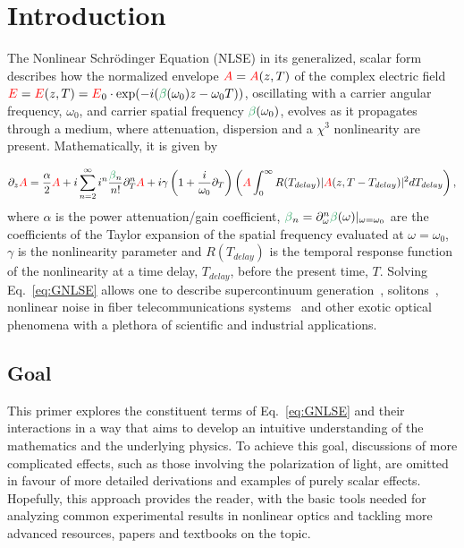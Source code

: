 \chapter{Introduction}
\label{ch:Introduction}
The Nonlinear Schr{\"o}dinger Equation (NLSE) in its generalized, scalar form describes how the normalized envelope $\textcolor{red}{A} =\textcolor{red}{A}(z,T)$ of the complex electric field $\E= \E(z,T) = \E_0\cdot \exp(-i(\betag(\omega_0)z-\omega_0T))$, oscillating with a carrier angular frequency, $\omega_0$, and carrier spatial frequency $\betag(\omega_0)$, evolves as it propagates through a medium, where attenuation, dispersion and a $\chi^{3}$ nonlinearity are present. Mathematically, it is given by

\begin{align}
    \label{eq:GNLSE}
    \partial_z \A = \frac{\alpha}{2}\A+i \sum_{n=2}^{\infty}i^n \frac{\betag_n}{n!}\partial_T^n\A  + i\gamma\left(1+\frac{i}{\omega_0}\partial_T  \right)\left( 
\A \int_{0}^{\infty} R(T_{delay})|\A(z,T-T_{delay})|^2 dT_{delay} \right),
\end{align}
where $\alpha$ is the power attenuation/gain coefficient, $\betag_n=\partial_\omega^n\betag(\omega)|_{\omega=\omega_0}$ are the coefficients of the Taylor expansion of the spatial frequency evaluated at $\omega = \omega_0$,  $\gamma$ is the nonlinearity parameter and $R(T_{delay})$ is the temporal response function of the nonlinearity at a time delay, $T_{delay}$, before the present time, $T$. Solving Eq.~\ref{eq:GNLSE} allows one to describe supercontinuum generation~\cite{supercontinuum_original_paper,NLSE_original}, solitons~\cite{soliton_first_theory,Soliton_experimental_first}, nonlinear noise in fiber telecommunications systems~\cite{poggiolini2014detailedanalyticalderivationgn} and other exotic optical phenomena with a plethora of scientific and industrial applications. 

\section{Goal}
This primer explores the constituent terms of Eq.~\ref{eq:GNLSE} and their interactions in a way that aims to develop an intuitive understanding of the mathematics and the underlying physics. To achieve this goal, discussions of more complicated effects, such as those involving the polarization of light, are omitted in favour of more detailed derivations and examples of purely scalar effects. Hopefully, this approach provides the reader, with the basic tools needed for analyzing common experimental results in nonlinear optics and tackling more advanced resources, papers and textbooks on the topic. 

